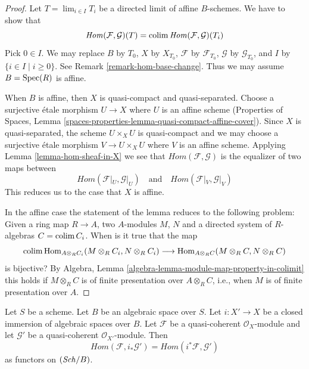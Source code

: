 \begin{proof}
Let $T = \lim_{i \in I} T_i$ be a directed limit of affine $B$-schemes.
We have to show that
$$
\mathit{Hom}(\mathcal{F}, \mathcal{G})(T) =
\mathop{\mathrm{colim}}\nolimits \mathit{Hom}(\mathcal{F}, \mathcal{G})(T_i)
$$
Pick $0 \in I$. We may replace $B$ by $T_0$, $X$ by $X_{T_0}$,
$\mathcal{F}$ by $\mathcal{F}_{T_0}$, $\mathcal{G}$ by
$\mathcal{G}_{T_0}$, and $I$ by $\{i \in I \mid i \geq 0\}$.
See Remark \ref{remark-hom-base-change}.
Thus we may assume $B = \mathop{\mathrm{Spec}}(R)$ is affine.

\medskip\noindent
When $B$ is affine, then $X$ is quasi-compact and quasi-separated.
Choose a surjective \'etale morphism $U \to X$ where $U$ is an
affine scheme (Properties of Spaces, Lemma
\ref{spaces-properties-lemma-quasi-compact-affine-cover}).
Since $X$ is quasi-separated, the scheme $U \times_X U$ is quasi-compact
and we may choose a surjective \'etale morphism $V \to U \times_X U$
where $V$ is an affine scheme. Applying Lemma \ref{lemma-hom-sheaf-in-X}
we see that $\mathit{Hom}(\mathcal{F}, \mathcal{G})$ is the
equalizer of two maps between
$$
\mathit{Hom}(\mathcal{F}|_U, \mathcal{G}|_U)
\quad\text{and}\quad
\mathit{Hom}(\mathcal{F}|_V, \mathcal{G}|_V)
$$
This reduces us to the case that $X$ is affine.

\medskip\noindent
In the affine case the statement of the lemma reduces to
the following problem: Given a ring map $R \to A$, two $A$-modules
$M$, $N$ and a directed system of $R$-algebras $C = \mathop{\mathrm{colim}}\nolimits C_i$.
When is it true that the map
$$
\mathop{\mathrm{colim}}\nolimits \mathop{\mathrm{Hom}}\nolimits_{A \otimes_R C_i}(M \otimes_R C_i, N \otimes_R C_i)
\longrightarrow
\mathop{\mathrm{Hom}}\nolimits_{A \otimes_R C}(M \otimes_R C, N \otimes_R C)
$$
is bijective? By
Algebra, Lemma \ref{algebra-lemma-module-map-property-in-colimit}
this holds if $M \otimes_R C$ is of finite presentation over
$A \otimes_R C$, i.e., when $M$ is of finite presentation over $A$.
\end{proof}

\begin{lemma}
\label{lemma-hom-closed}
Let $S$ be a scheme. Let $B$ be an algebraic space over $S$.
Let $i : X' \to X$ be a closed immersion of algebraic spaces
over $B$. Let $\mathcal{F}$ be a quasi-coherent $\mathcal{O}_X$-module
and let $\mathcal{G}'$ be a quasi-coherent $\mathcal{O}_{X'}$-module.
Then
$$
\mathit{Hom}(\mathcal{F}, i_*\mathcal{G}') =
\mathit{Hom}(i^*\mathcal{F}, \mathcal{G}')
$$
as functors on $(\mathit{Sch}/B)$.
\end{lemma}

